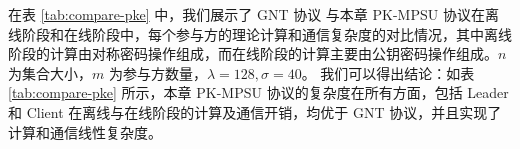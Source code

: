 在表 \ref{tab:compare-pke} 中，我们展示了 GNT 协议 与本章 PK-MPSU 协议在离线阶段和在线阶段中，每个参与方的理论计算和通信复杂度的对比情况，其中离线阶段的计算由对称密码操作组成，而在线阶段的计算主要由公钥密码操作组成。$n$ 为集合大小，$m$ 为参与方数量，$\lambda=128, \sigma=40$。
我们可以得出结论：如表 \ref{tab:compare-pke} 所示，本章 PK-MPSU 协议的复杂度在所有方面，包括 Leader 和 Client 在离线与在线阶段的计算及通信开销，均优于 GNT 协议，并且实现了计算和通信线性复杂度。

\begin{table}
\centering
{}
  \caption{GNT 协议与 PK-MPSU 协议在离线和在线阶段的理论计算与通信复杂度对比}
\label{tab:compare-pke}
\end{table}





